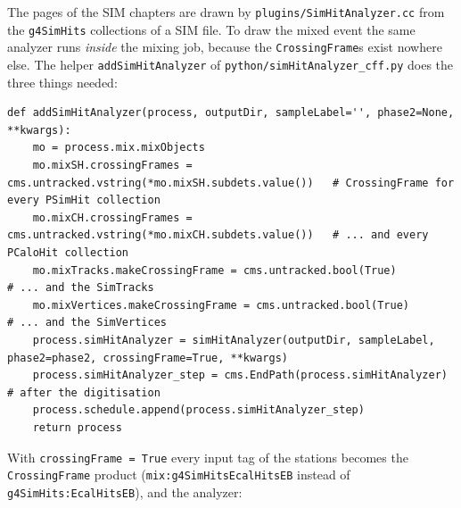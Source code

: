 \documentclass[11pt,a4paper]{article}
\newcommand{\code}[1]{\texttt{#1}}
\begin{document}
The pages of the SIM chapters are drawn by \code{plugins/SimHitAnalyzer.cc} from the \code{g4SimHits}
collections of a SIM file. To draw the mixed event the same analyzer runs \emph{inside} the mixing job,
because the \code{CrossingFrame}s exist nowhere else. The helper \code{addSimHitAnalyzer} of
\code{python/simHitAnalyzer\_cff.py} does the three things needed:
\begin{lstlisting}[style=py]
def addSimHitAnalyzer(process, outputDir, sampleLabel='', phase2=None, **kwargs):
    mo = process.mix.mixObjects
    mo.mixSH.crossingFrames = cms.untracked.vstring(*mo.mixSH.subdets.value())   # CrossingFrame for every PSimHit collection
    mo.mixCH.crossingFrames = cms.untracked.vstring(*mo.mixCH.subdets.value())   # ... and every PCaloHit collection
    mo.mixTracks.makeCrossingFrame = cms.untracked.bool(True)                     # ... and the SimTracks
    mo.mixVertices.makeCrossingFrame = cms.untracked.bool(True)                   # ... and the SimVertices
    process.simHitAnalyzer = simHitAnalyzer(outputDir, sampleLabel, phase2=phase2, crossingFrame=True, **kwargs)
    process.simHitAnalyzer_step = cms.EndPath(process.simHitAnalyzer)             # after the digitisation
    process.schedule.append(process.simHitAnalyzer_step)
    return process
\end{lstlisting}
With \code{crossingFrame = True} every input tag of the stations becomes the \code{CrossingFrame} product
(\code{mix:g4SimHitsEcalHitsEB} instead of \code{g4SimHits:EcalHitsEB}), and the analyzer:
\end{document}
